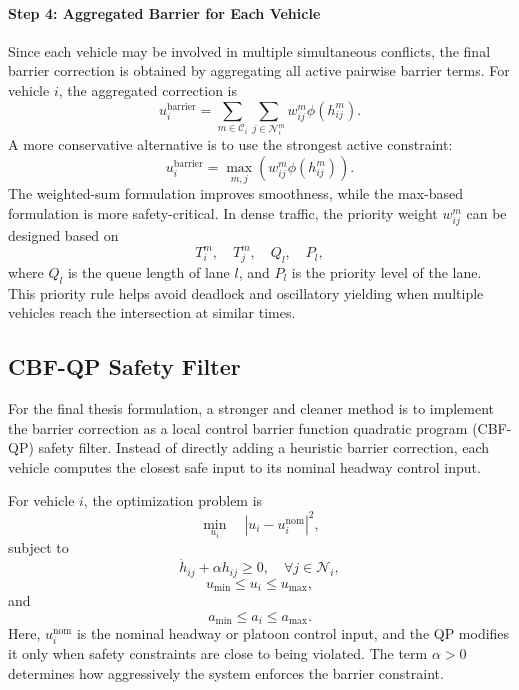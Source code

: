 \documentclass[conference]{IEEEtran}
\begin{document}
\paragraph{Step 4: Aggregated Barrier for Each Vehicle}
Since each vehicle may be involved in multiple simultaneous conflicts, the final barrier correction is obtained by aggregating all active pairwise barrier terms. For vehicle $i$, the aggregated correction is
\begin{equation}
u_i^{\text{barrier}}
=
\sum_{m\in \mathcal{C}_i}
\sum_{j\in \mathcal{N}_i^m}
w_{ij}^m \phi(h_{ij}^m).
\end{equation}
A more conservative alternative is to use the strongest active constraint:
\begin{equation}
u_i^{\text{barrier}}
=
\max_{m,j}
\left(
w_{ij}^m \phi(h_{ij}^m)
\right).
\end{equation}
The weighted-sum formulation improves smoothness, while the max-based formulation is more safety-critical. In dense traffic, the priority weight $w_{ij}^m$ can be designed based on
\begin{equation}
T_i^m,\quad T_j^m,\quad Q_l,\quad P_l,
\end{equation}
where $Q_l$ is the queue length of lane $l$, and $P_l$ is the priority level of the lane. This priority rule helps avoid deadlock and oscillatory yielding when multiple vehicles reach the intersection at similar times.

\subsection{CBF-QP Safety Filter}
For the final thesis formulation, a stronger and cleaner method is to implement the barrier correction as a local control barrier function quadratic program (CBF-QP) safety filter. Instead of directly adding a heuristic barrier correction, each vehicle computes the closest safe input to its nominal headway control input.

For vehicle $i$, the optimization problem is
\begin{equation}
\min_{u_i}
\quad
|u_i-u_i^{\text{nom}}|^2,
\end{equation}
subject to
\begin{equation}
\dot{h}_{ij}+\alpha h_{ij}\geq 0,
\quad
\forall j\in \mathcal{N}_i,
\end{equation}
\begin{equation}
u_{\min}\leq u_i\leq u_{\max},
\end{equation}
and
\begin{equation}
a_{\min}\leq a_i\leq a_{\max}.
\end{equation}
Here, $u_i^{\text{nom}}$ is the nominal headway or platoon control input, and the QP modifies it only when safety constraints are close to being violated. The term $\alpha>0$ determines how aggressively the system enforces the barrier constraint.
\end{document}

